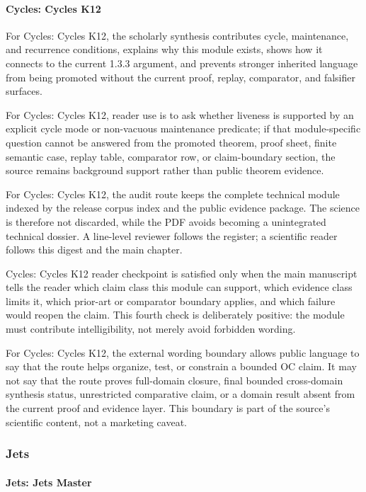 \paragraph{Cycles: Cycles K12}

For Cycles: Cycles K12, the scholarly synthesis contributes cycle, maintenance, and recurrence conditions, explains why this module exists, shows how it connects to the current 1.3.3 argument, and prevents stronger inherited language from being promoted without the current proof, replay, comparator, and falsifier surfaces.


For Cycles: Cycles K12, reader use is to ask whether liveness is supported by an explicit cycle mode or non-vacuous maintenance predicate; if that module-specific question cannot be answered from the promoted theorem, proof sheet, finite semantic case, replay table, comparator row, or claim-boundary section, the source remains background support rather than public theorem evidence.


For Cycles: Cycles K12, the audit route keeps the complete technical module indexed by the release corpus index and the public evidence package. The science is therefore not discarded, while the PDF avoids becoming a unintegrated technical dossier. A line-level reviewer follows the register; a scientific reader follows this digest and the main chapter.


Cycles: Cycles K12 reader checkpoint is satisfied only when the main manuscript tells the reader which claim class this module can support, which evidence class limits it, which prior-art or comparator boundary applies, and which failure would reopen the claim. This fourth check is deliberately positive: the module must contribute intelligibility, not merely avoid forbidden wording.


For Cycles: Cycles K12, the external wording boundary allows public language to say that the route helps organize, test, or constrain a bounded OC claim. It may not say that the route proves full-domain closure, final bounded cross-domain synthesis status, unrestricted comparative claim, or a domain result absent from the current proof and evidence layer. This boundary is part of the source's scientific content, not a marketing caveat.


\subsubsection{Jets}

\paragraph{Jets: Jets Master}

